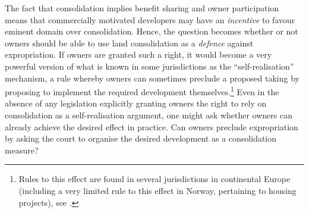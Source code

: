 
The fact that consolidation implies benefit sharing and owner participation means that commercially motivated developers may have an {\it incentive} to favour eminent domain over consolidation. Hence, the question becomes whether or not owners should be able to use land consolidation as a {\it defence} against expropriation. If owners are granted such a right, it would become a very powerful version of what is known in some jurisdictions as the ``self-realisation'' mechanism, a rule whereby owners can sometimes preclude a proposed taking by proposing to implement the required development themselves.\footnote{Rules to this effect are found in several jurisdictions in continental Europe (including a very limited rule to this effect in Norway, pertaining to housing projects), see \cite[13-14]{sluysmans15}.} Even in the absence of any legislation explicitly granting owners the right to rely on consolidation as a self-realisation argument, one might ask whether owners can already achieve the desired effect in practice. Can owners preclude expropriation by asking the court to organise the desired development as a consolidation measure?


